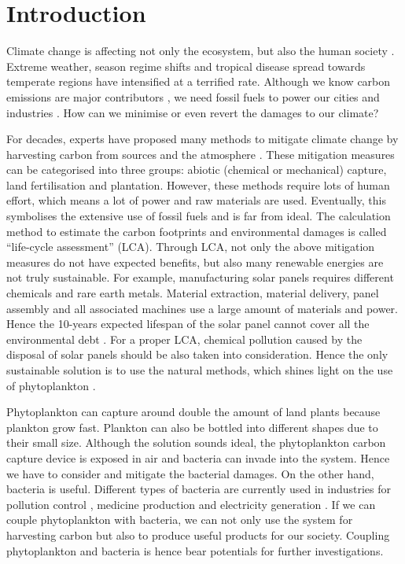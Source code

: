 \documentclass[../thesis.tex]{subfiles} %
\begin{document}
\section{Introduction}

Climate change is affecting not only the ecosystem, but also the human society \autocite{notz2016observed,schuur2015climate}.  Extreme weather, season regime shifts and tropical disease spread towards temperate regions have intensified at a terrified rate.  Although we know carbon emissions are major contributors \autocite{notz2016observed}, we need fossil fuels to power our cities and industries \autocite{ferguson2000electricity}.  How can we minimise or even revert the damages to our climate?

For decades, experts have proposed many methods to mitigate climate change by harvesting carbon from sources and the atmosphere \autocite{farrelly2013carbon,yang2008progress}.  These mitigation measures can be categorised into three groups: abiotic (chemical or mechanical) capture, land fertilisation and plantation.  However, these methods require lots of human effort, which means a lot of power and raw materials are used.  Eventually, this symbolises the extensive use of fossil fuels and is far from ideal.  The calculation method to estimate the carbon footprints and environmental damages is called ``life-cycle assessment” (LCA).  Through LCA, not only the above mitigation measures do not have expected benefits, but also many renewable energies are not truly sustainable.  For example, manufacturing solar panels requires different chemicals and rare earth metals.  Material extraction, material delivery, panel assembly and all associated machines use a large amount of materials and power.  Hence the 10-years expected lifespan of the solar panel cannot cover all the environmental debt \autocite{}.  For a proper LCA, chemical pollution caused by the disposal of solar panels should be also taken into consideration.  Hence the only sustainable solution is to use the natural methods, which shines light on the use of phytoplankton \autocite{farrelly2013carbon}.

Phytoplankton can capture around double the amount of land plants \autocite{SCHLESINGER2013341} because plankton grow fast.  Plankton can also be bottled into different shapes \autocite{evanson_2019} due to their small size.  Although the solution sounds ideal, the phytoplankton carbon capture device is exposed in air and bacteria can invade into the system.  Hence we have to consider and mitigate the bacterial damages.  On the other hand, bacteria is useful.  Different types of bacteria are currently used in industries for pollution control \autocite{dash2013marine,naik2013lead}, medicine production \autocite{huang2012industrial} and electricity generation \autocite{songera2012electricity}.  If we can couple phytoplankton with bacteria, we can not only use the system for harvesting carbon but also to produce useful products for our society.  Coupling phytoplankton and bacteria is hence bear potentials for further investigations.
\end{document}

